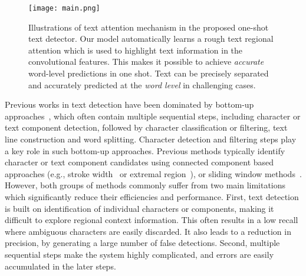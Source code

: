 \documentclass[10pt,twocolumn,letterpaper]{article}
\begin{document}
\begin{figure}[t!]
   \centering
   \texttt{[image: main.png]}
   \caption{Illustrations of text attention mechanism in the proposed one-shot text detector. Our model automatically learns a rough text regional attention which is used to highlight text information in the convolutional features. This makes it possible to achieve \textit{accurate} word-level predictions in one shot. Text can be precisely separated and accurately predicted at the \textit{word level} in challenging cases.}
   \label{fig:main}
\end{figure}

Previous works in text detection have been dominated by bottom-up approaches~\cite{Epshtein2010,Huang2013, Huang2014, Yin2014,He2016}, which often contain multiple sequential steps, including character or text component detection, followed by character classification or filtering, text line construction and word splitting. Character detection and filtering steps play a key role in such bottom-up approaches. Previous methods typically identify  character or text component candidates using connected component based approaches (e.g., stroke width~\cite{Epshtein2010,Huang2013} or extremal region~\cite{Neumann2012, Huang2014,Yin2014}),  or sliding window methods~\cite{Jaderberg2014, Wang2012,Pan2016_reading}. However, both groups of methods commonly suffer from two main limitations which significantly reduce their efficiencies and performance. First, text detection is built on identification of individual characters or components, making it difficult to explore regional context information. This often results in a low recall where ambiguous characters are easily discarded. It also leads to a reduction in precision, by generating a large number of false detections.  Second, multiple sequential steps make the system highly complicated, and errors are easily accumulated in the later steps.
\end{document}
